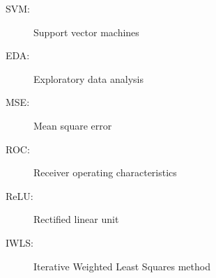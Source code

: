 





%
%


\listofacronyms %

\begin{description}
\item[SVM:] Support vector machines
\item[EDA:] Exploratory data analysis
\item[MSE:] Mean square error
\item[ROC:] Receiver operating characteristics
\item[ReLU:] Rectified linear unit
\item[IWLS:] Iterative Weighted Least Squares method
\end{description}









%
%

\listoffigures
\listoftables

